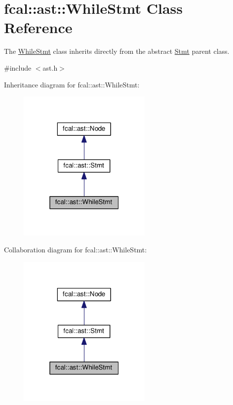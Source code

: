 \hypertarget{classfcal_1_1ast_1_1WhileStmt}{}\section{fcal\+:\+:ast\+:\+:While\+Stmt Class Reference}
\label{classfcal_1_1ast_1_1WhileStmt}


The \hyperlink{classfcal_1_1ast_1_1WhileStmt}{While\+Stmt} class inherits directly from the abstract \hyperlink{classfcal_1_1ast_1_1Stmt}{Stmt} parent class.  




{\ttfamily \#include $<$ast.\+h$>$}



Inheritance diagram for fcal\+:\+:ast\+:\+:While\+Stmt\+:\nopagebreak
\begin{figure}[H]
\begin{center}
\leavevmode
\includegraphics[width=184pt]{classfcal_1_1ast_1_1WhileStmt__inherit__graph}
\end{center}
\end{figure}


Collaboration diagram for fcal\+:\+:ast\+:\+:While\+Stmt\+:\nopagebreak
\begin{figure}[H]
\begin{center}
\leavevmode
\includegraphics[width=184pt]{classfcal_1_1ast_1_1WhileStmt__coll__graph}
\end{center}
\end{figure}

